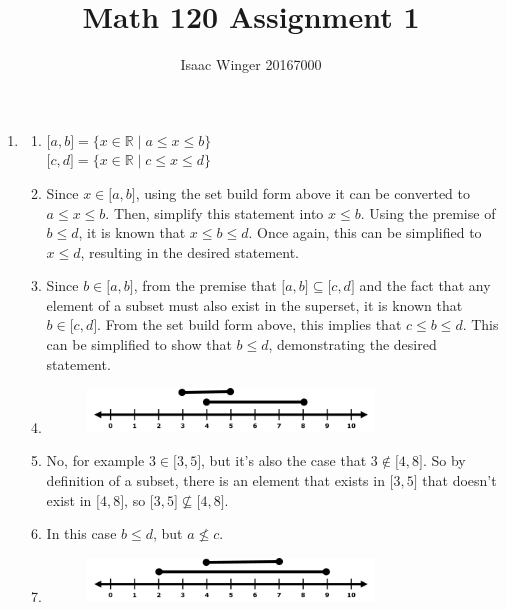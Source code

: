 \documentclass{article}
\title{Math 120 Assignment 1}
\author{Isaac Winger 20167000}
\date{}
\begin{document}
    \begin{enumerate} \addtocounter{enumi}{2}
      \item \begin{enumerate}
                    \item $ \lbrack a,b \rbrack = \{x \in \mathbb{R} \mid a \leq x \leq b\} $ \\
                    $ \lbrack c,d \rbrack = \{x \in \mathbb{R} \mid c \leq x \leq d\} $

                    \item Since $x \in \lbrack a,b \rbrack$, using the set build form above it can be converted to $a \leq x \leq b$. Then, simplify this statement into $x \leq b$. Using the premise of $b \leq d$, it is known that $x \leq b \leq d$. Once again, this can be simplified to $x \leq d$, resulting in the desired statement.

                    \item Since $b \in \lbrack a,b \rbrack$, from the premise that $\lbrack a,b \rbrack \subseteq \lbrack c,d \rbrack$ and the fact that any element of a subset must also exist in the superset, it is known that $b \in \lbrack c,d \rbrack$. From the set build form above, this implies that $c \leq b \leq d$. This can be simplified to show that $b \leq d$, demonstrating the desired statement.

                    \item \begin{figure}[h]\centering\includegraphics[width=3in]{numline}\end{figure} \vspace{-10ex}

                    \vspace{5ex}\item No, for example $3 \in \lbrack 3,5 \rbrack$, but it's also the case that $3 \notin \lbrack 4,8 \rbrack$. So by definition of a subset, there is an element that exists in $\lbrack 3,5 \rbrack$ that doesn't exist in $\lbrack 4,8 \rbrack$, so $\lbrack 3,5 \rbrack \not\subseteq \lbrack 4,8 \rbrack$.

              \item In this case $b \leq d$, but $a \not\leq c$.

                    \item \begin{figure}[h]\centering\includegraphics[width=3in]{numline2}\end{figure} \vspace{-10ex}


\end{enumerate}
\end{enumerate}
\end{document}
